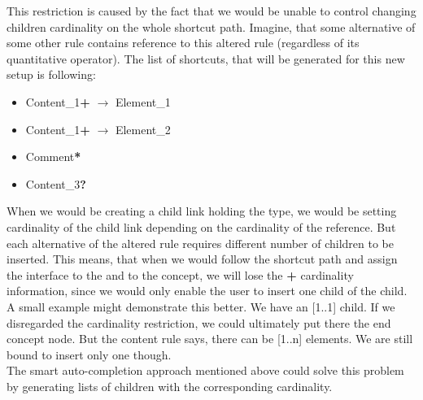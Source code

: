This restriction is caused by the fact that we would be unable to control changing children cardinality on the whole shortcut path.
Imagine, that some alternative of some other rule contains reference to this altered  rule (regardless of its quantitative operator).
The list of shortcuts, that will be generated for this new setup is following:

\begin{itemize}
	\itemsep0em
	\item Content{\_}1\textbf{+} $\rightarrow$ Element{\_}1
	\item Content{\_}1\textbf{+} $\rightarrow$ Element{\_}2
	\item Comment\textbf{*}
	\item Content{\_}3\textbf{?}
\end{itemize}

When we would be creating a child link holding the  type, we would be setting cardinality of the child link depending on the cardinality of the  reference.
But each alternative of the altered  rule requires different number of children to be inserted.
This means, that when we would follow the shortcut path and assign the  interface to the  and to the  concept, we will lose the \textbf{+} cardinality information, since we would only enable the user to insert one child of the  child.
\\

A small example might demonstrate this better.
We have an  [1..1] child.
If we disregarded the cardinality restriction, we could ultimately put there the  end concept node.
But the content rule says, there can be [1..n] elements.
We are still bound to insert only one though.
\\

The smart auto-completion approach mentioned above could solve this problem by generating lists of children with the corresponding cardinality.
